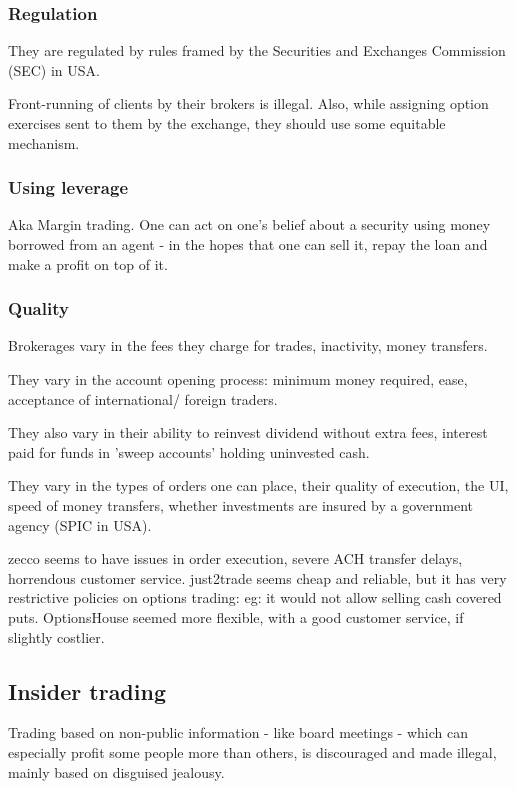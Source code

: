 \documentclass[oneside, article]{memoir}
\begin{document}
\subsubsection{Regulation}
They are regulated by rules framed by the Securities and Exchanges Commission (SEC) in USA.

Front-running of clients by their brokers is illegal. Also, while assigning option exercises sent to them by the exchange, they should use some equitable mechanism.

\subsubsection{Using leverage}
Aka Margin trading. One can act on one's belief about a security using money borrowed from an agent - in the hopes that one can sell it, repay the loan and make a profit on top of it.

\subsubsection{Quality}
Brokerages vary in the fees they charge for trades, inactivity, money transfers.

They vary in the account opening process: minimum money required, ease, acceptance of international/ foreign traders.

They also vary in their ability to reinvest dividend without extra fees, interest paid for funds in 'sweep accounts' holding uninvested cash.

They vary in the types of orders one can place, their quality of execution, the UI, speed of money transfers, whether investments are insured by a government agency (SPIC in USA).

zecco seems to have issues in order execution, severe ACH transfer delays, horrendous customer service. just2trade seems cheap and reliable, but it has very restrictive policies on options trading: eg: it would not allow selling cash covered puts. OptionsHouse seemed more flexible, with a good customer service, if slightly costlier.

\subsection{Insider trading}
Trading based on non-public information - like board meetings - which can especially profit some people more than others, is discouraged and made illegal, mainly based on disguised jealousy.
\end{document}
